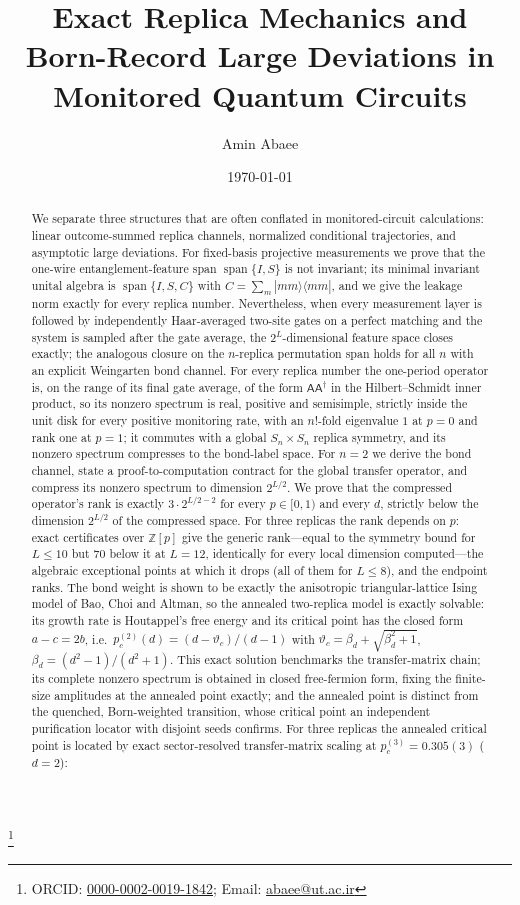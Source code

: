 \documentclass[aps,prx,reprint,superscriptaddress,nobibnotes,longbibliography]{revtex4-2}
\theoremstyle{remark}
\newcommand{\vth}{\vartheta}
\begin{document}
\title{Exact Replica Mechanics and Born-Record Large Deviations in Monitored Quantum Circuits}
\author{Amin Abaee}
\thanks{ORCID: \href{https://orcid.org/0000-0002-0019-1842}{0000-0002-0019-1842}; Email: \href{mailto:abaee@ut.ac.ir}{abaee@ut.ac.ir}}
\date{\today}

\begin{abstract}
We separate three structures that are often conflated in monitored-circuit calculations: linear outcome-summed replica channels, normalized conditional trajectories, and asymptotic large deviations.  For fixed-basis projective measurements we prove that the one-wire entanglement-feature span $\operatorname{span}\{I,S\}$ is not invariant; its minimal invariant unital algebra is $\operatorname{span}\{I,S,C\}$ with $C=\sum_m|mm\rangle\langle mm|$, and we give the leakage norm exactly for every replica number.  Nevertheless, when every measurement layer is followed by independently Haar-averaged two-site gates on a perfect matching and the system is sampled after the gate average, the $2^L$-dimensional feature space closes exactly; the analogous closure on the $n$-replica permutation span holds for all $n$ with an explicit Weingarten bond channel.  For every replica number the one-period operator is, on the range of its final gate average, of the form $\mathsf A\mathsf A^\dagger$ in the Hilbert--Schmidt inner product, so its nonzero spectrum is real, positive and semisimple, strictly inside the unit disk for every positive monitoring rate, with an $n!$-fold eigenvalue $1$ at $p=0$ and rank one at $p=1$; it commutes with a global $S_n\times S_n$ replica symmetry, and its nonzero spectrum compresses to the bond-label space.  For $n=2$ we derive the bond channel, state a proof-to-computation contract for the global transfer operator, and compress its nonzero spectrum to dimension $2^{L/2}$.  We prove that the compressed operator's rank is exactly $3\cdot2^{L/2-2}$ for every $p\in[0,1)$ and every $d$, strictly below the dimension $2^{L/2}$ of the compressed space.  For three replicas the rank depends on $p$: exact certificates over $\mathbb Z[p]$ give the generic rank---equal to the symmetry bound for $L\le10$ but $70$ below it at $L=12$, identically for every local dimension computed---the algebraic exceptional points at which it drops (all of them for $L\le8$), and the endpoint ranks.  The bond weight is shown to be exactly the anisotropic triangular-lattice Ising model of Bao, Choi and Altman, so the annealed two-replica model is exactly solvable: its growth rate is Houtappel's free energy and its critical point has the closed form $a-c=2b$, i.e.\ $p_c^{(2)}(d)=(d-\vth_c)/(d-1)$ with $\vth_c=\beta_d+\sqrt{\beta_d^2+1}$, $\beta_d=(d^2-1)/(d^2+1)$.  This exact solution benchmarks the transfer-matrix chain; its complete nonzero spectrum is obtained in closed free-fermion form, fixing the finite-size amplitudes at the annealed point exactly; and the annealed point is distinct from the quenched, Born-weighted transition, whose critical point an independent purification locator with disjoint seeds confirms.  For three replicas the annealed critical point is located by exact sector-resolved transfer-matrix scaling at $p_c^{(3)}=0.305(3)$ ($d=2$): 
\end{abstract}
\end{document}
